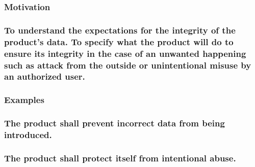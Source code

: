 \documentclass[
]{article}
\begin{document}
\hypertarget{motivation-52}{%
\subsubsection{Motivation}\label{motivation-52}}

\hypertarget{to-understand-the-expectations-for-the-integrity-of-the-products-data.-to-specify-what-the-product-will-do-to-ensure-its-integrity-in-the-case-of-an-unwanted-happening-such-as-attack-from-the-outside-or-unintentional-misuse-by-an-authorized-user.}{%
\subsubsection{\texorpdfstring{To understand the expectations for the
integrity of the product's data. To specify what the product will do to
ensure its integrity in the case of an unwanted happening such as attack
from the outside or unintentional misuse by an authorized user.
}{To understand the expectations for the integrity of the product's data. To specify what the product will do to ensure its integrity in the case of an unwanted happening such as attack from the outside or unintentional misuse by an authorized user. }}\label{to-understand-the-expectations-for-the-integrity-of-the-products-data.-to-specify-what-the-product-will-do-to-ensure-its-integrity-in-the-case-of-an-unwanted-happening-such-as-attack-from-the-outside-or-unintentional-misuse-by-an-authorized-user.}}

\hypertarget{examples-36}{%
\subsubsection{Examples}\label{examples-36}}

\hypertarget{the-product-shall-prevent-incorrect-data-from-being-introduced.}{%
\subsubsection{The product shall prevent incorrect data from being
introduced.}\label{the-product-shall-prevent-incorrect-data-from-being-introduced.}}

\hypertarget{the-product-shall-protect-itself-from-intentional-abuse.}{%
\subsubsection{The product shall protect itself from intentional
abuse.}\label{the-product-shall-protect-itself-from-intentional-abuse.}}
\end{document}
